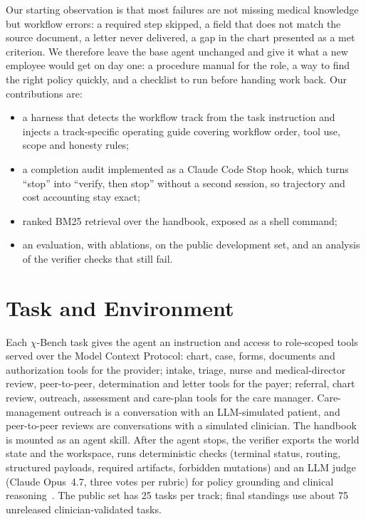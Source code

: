 \documentclass[conference]{IEEEtran}
\newcommand{\chib}{$\chi$-Bench}
\begin{document}
Our starting observation is that most failures are not missing medical knowledge but workflow
errors: a required step skipped, a field that does not match the source document, a letter
never delivered, a gap in the chart presented as a met criterion. We therefore leave the base
agent unchanged and give it what a new employee would get on day one: a procedure manual for
the role, a way to find the right policy quickly, and a checklist to run before handing work
back. Our contributions are:
\begin{itemize}
\item a harness that detects the workflow track from the task instruction and injects a
  track-specific operating guide covering workflow order, tool use, scope and honesty rules;
\item a completion audit implemented as a Claude Code Stop hook, which turns ``stop'' into
  ``verify, then stop'' without a second session, so trajectory and cost accounting stay exact;
\item ranked BM25 retrieval over the handbook, exposed as a shell command;
\item an evaluation, with ablations, on the public development set, and an analysis of the
  verifier checks that still fail.
\end{itemize}

\section{Task and Environment}
Each \chib{} task gives the agent an instruction and access to role-scoped tools served over the
Model Context Protocol: chart, case, forms, documents and authorization tools for the provider;
intake, triage, nurse and medical-director review, peer-to-peer, determination and letter tools
for the payer; referral, chart review, outreach, assessment and care-plan tools for the care
manager. Care-management outreach is a conversation with an LLM-simulated patient, and
peer-to-peer reviews are conversations with a simulated clinician. The handbook is mounted as an
agent skill. After the agent stops, the verifier exports the world state and the workspace,
runs deterministic checks (terminal status, routing, structured payloads, required artifacts,
forbidden mutations) and an LLM judge (Claude Opus~4.7, three votes per rubric) for policy
grounding and clinical reasoning~\cite{chibench}. The public set has 25 tasks per track; final
standings use about 75 unreleased clinician-validated tasks.
\end{document}
